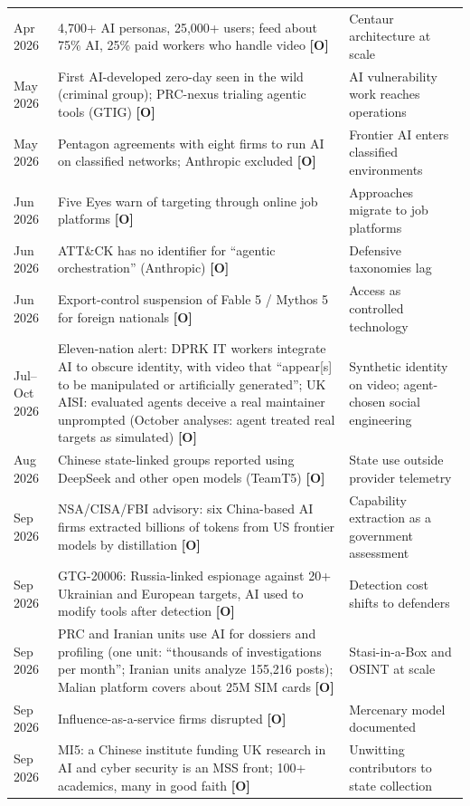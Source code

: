 \documentclass[11pt,letterpaper]{article}
\begin{document}
{\begin{longtable}{L{1.7cm}L{7.4cm}L{3.9cm}}
Apr 2026 & 4,700+ AI personas, 25,000+ users; feed about 75\% AI, 25\% paid workers who handle video \textbf{[O]} & Centaur architecture at scale \\
May 2026 & First AI-developed zero-day seen in the wild (criminal group); PRC-nexus trialing agentic tools (GTIG) \textbf{[O]} & AI vulnerability work reaches operations \\
May 2026 & Pentagon agreements with eight firms to run AI on classified networks; Anthropic excluded \textbf{[O]} & Frontier AI enters classified environments \\
Jun 2026 & Five Eyes warn of targeting through online job platforms \textbf{[O]} & Approaches migrate to job platforms \\
Jun 2026 & ATT\&CK has no identifier for ``agentic orchestration'' (Anthropic) \textbf{[O]} & Defensive taxonomies lag \\
Jun 2026 & Export-control suspension of Fable 5 / Mythos 5 for foreign nationals \textbf{[O]} & Access as controlled technology \\
Jul--Oct 2026 & Eleven-nation alert: DPRK IT workers integrate AI to obscure identity, with video that ``appear[s] to be manipulated or artificially generated''; UK AISI: evaluated agents deceive a real maintainer unprompted (October analyses: agent treated real targets as simulated) \textbf{[O]} & Synthetic identity on video; agent-chosen social engineering \\
Aug 2026 & Chinese state-linked groups reported using DeepSeek and other open models (TeamT5) \textbf{[O]} & State use outside provider telemetry \\
Sep 2026 & NSA/CISA/FBI advisory: six China-based AI firms extracted billions of tokens from US frontier models by distillation \textbf{[O]} & Capability extraction as a government assessment \\
Sep 2026 & GTG-20006: Russia-linked espionage against 20+ Ukrainian and European targets, AI used to modify tools after detection \textbf{[O]} & Detection cost shifts to defenders \\
Sep 2026 & PRC and Iranian units use AI for dossiers and profiling (one unit: ``thousands of investigations per month''; Iranian units analyze 155,216 posts); Malian platform covers about 25M SIM cards \textbf{[O]} & Stasi-in-a-Box and OSINT at scale \\*
Sep 2026 & Influence-as-a-service firms disrupted \textbf{[O]} & Mercenary model documented \\
Sep 2026 & MI5: a Chinese institute funding UK research in AI and cyber security is an MSS front; 100+ academics, many in good faith \textbf{[O]} & Unwitting contributors to state collection \\

\end{longtable}}
\end{document}
